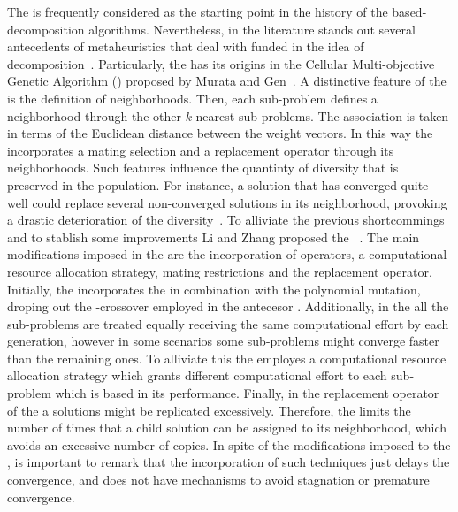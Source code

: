 The \MOEAD{} is frequently considered as the starting point in the history of the based-decomposition algorithms.
%
Nevertheless, in the literature stands out several antecedents of metaheuristics that deal with \MOPS{} funded in the idea of decomposition~\cite{ishibuchi1998multi, murata2002cellular}.
%
Particularly, the \MOEAD{} has its origins in the Cellular Multi-objective Genetic Algorithm (\CMOEA{}) proposed by Murata and Gen~\cite{murata2002cellular}.
%
A distinctive feature of the \MOEAD{} is the definition of neighborhoods.
%
Then, each sub-problem defines a neighborhood through the other $k$-nearest sub-problems.
%
The association is taken in terms of the Euclidean distance between the weight vectors.
%
In this way the \MOEAD{} incorporates a mating selection and a replacement operator through its neighborhoods.
%
Such features influence the quantinty of diversity that is preserved in the population.
%
For instance, a solution that has converged quite well could replace several non-converged solutions in its neighborhood, provoking a drastic deterioration of the diversity~\cite{wang2015constrained}.
%
To alliviate the previous shortcommings and to stablish some improvements Li and Zhang proposed the \MOEADDE{}~\cite{li2009multiobjective}.
%
The main modifications imposed in the \MOEADDE{} are the incorporation of \DE{} operators, a computational resource allocation strategy, mating restrictions and the replacement operator.
%
Initially, the \MOEADDE{} incorporates the \DE{} in combination with the polynomial mutation, droping out the \SBX{}-crossover  employed in the antecesor \MOEAD{}.
%
Additionally, in the \MOEAD{} all the sub-problems are treated equally receiving the same computational effort by each generation, however in some scenarios some sub-problems might converge faster than the remaining ones.
%
To alliviate this the \MOEADDE{} employes a computational resource allocation strategy which grants different computational effort to each sub-problem which is based in its performance.
%
Finally, in the replacement operator of the \MOEAD{} a solutions might be replicated excessively.
%
Therefore, the \MOEADDE{} limits the number of times that a child solution can be assigned to its neighborhood, which avoids an excessive number of copies.
%
In spite of the modifications imposed to the \MOEADDE{}, is important to remark that the incorporation of such techniques just delays the convergence, and does not have mechanisms to avoid stagnation or premature convergence.
%
